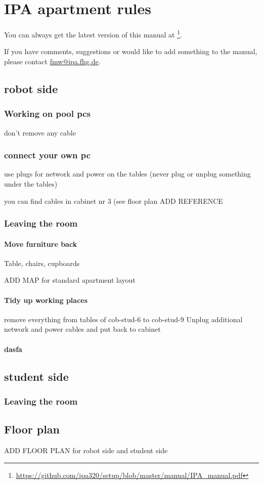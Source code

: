\chapter{IPA apartment rules}
\label{chap:apartment-rules} 

You can always get the latest version of this manual at \footnote{\url{https://github.com/ipa320/setup/blob/master/manual/IPA_manual.pdf}}.

If you have comments, suggestions or would like to add something to the manual, please contact \href{mailto:fmw@ipa.fhg.de}{fmw@ipa.fhg.de}.

\section{robot side}


\subsection{Working on pool pcs}
don't remove any cable
\subsection{connect your own pc}
use plugs for network and power on the tables (never plug or unplug something under the tables)

you can find cables in cabinet nr 3 (see floor plan ADD REFERENCE


\subsection{Leaving the room}
\subsubsection{Move furniture back}
Table, chairs, cupboards

ADD MAP for standard apartment layout

\subsubsection{Tidy up working places}
remove everything from tables of cob-stud-6 to cob-stud-9
Unplug additional network and power cables and put back to cabinet

\subsubsection{dasfa}


\section{student side}
\subsection{Leaving the room}

\section{Floor plan}
ADD FLOOR PLAN for robot side and student side